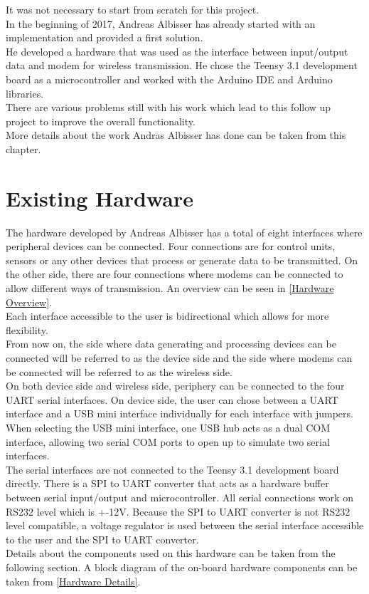 %
%
It was not necessary to start from scratch for this project. \\
In the beginning of 2017, Andreas Albisser has already started with an implementation and provided a first solution. \\
He developed a hardware that was used as the interface between input/output data and modem for wireless transmission. He chose the Teensy 3.1 development board as a microcontroller and worked with the Arduino IDE and Arduino libraries. \\
There are various problems still with his work which lead to this follow up project to improve the overall functionality.\\
More details about the work Andras Albisser has done can be taken from this chapter. \\
%
%
%
\section{Existing Hardware}
%
%
The hardware developed by Andreas Albisser has a total of eight interfaces where peripheral devices can be connected. Four connections are for control units, sensors or any other devices that process or generate data to be transmitted. On the other side, there are four connections where modems can be connected to allow different ways of transmission. An overview can be seen in \autoref{Hardware Overview}.\\
Each interface accessible to the user is bidirectional which allows for more flexibility. \\
From now on, the side where data generating and processing devices can be connected will be referred to as the device side and the side where modems can be connected will be referred to as the wireless side.\\
On both device side and wireless side, periphery can be connected to the four UART serial interfaces. On device side, the user can chose between a UART interface and a USB mini interface individually for each interface with jumpers. When selecting the USB mini interface, one USB hub acts as a dual COM interface, allowing two serial COM ports to open up to simulate two serial interfaces. \\
The serial interfaces are not connected to the Teensy 3.1 development board directly. There is a SPI to UART converter that acts as a hardware buffer between serial input/output and microcontroller.
All serial connections work on RS232 level which is +-12V. Because the SPI to UART converter is not RS232 level compatible, a voltage regulator is used between the serial interface accessible to the user and the SPI to UART converter.\\
Details about the components used on this hardware can be taken from the following section.
A block diagram of the on-board hardware components can be taken from \autoref{Hardware Details}.\\
%
%
